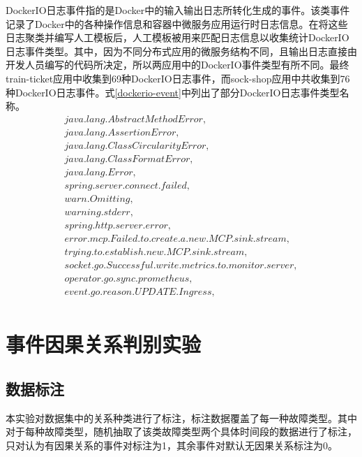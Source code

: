 DockerIO日志事件指的是Docker中的输入输出日志所转化生成的事件。该类事件记录了Docker\cite{boettiger2015introduction}中的各种操作信息和容器中微服务应用运行时日志信息。在将这些日志聚类并编写人工模板后，人工模板被用来匹配日志信息以收集统计DockerIO日志事件类型。其中，因为不同分布式应用的微服务结构不同，且输出日志直接由开发人员编写的代码所决定，所以两应用中的DockerIO事件类型有所不同。最终train-ticket应用中收集到69种DockerIO日志事件，而sock-shop应用中共收集到76种DockerIO日志事件。式\ref{dockerio-event}中列出了部分DockerIO日志事件类型名称。
\begin{equation}
    \begin{array}{l}
        java.lang.AbstractMethodError,\\
        java.lang.AssertionError,\\
        java.lang.ClassCircularityError,\\
        java.lang.ClassFormatError,\\
        java.lang.Error,\\
        spring.server.connect.failed,\\
        warn.Omitting,\\
        warning.stderr,\\
        spring.http.server.error,\\
        error.mcp.Failed.to.create.a.new.MCP.sink.stream,\\
        trying.to.establish.new.MCP.sink.stream,\\
        socket.go.Successful.write.metrics.to.monitor.server,\\
        operator.go.sync.prometheus,\\
        event.go.reason.UPDATE.Ingress,\\
    \end{array}
    \label{dockerio-event}
\end{equation}

\section{事件因果关系判别实验}
\subsection{数据标注}
本实验对数据集中的关系种类进行了标注，标注数据覆盖了每一种故障类型。其中对于每种故障类型，随机抽取了该类故障类型两个具体时间段的数据进行了标注，只对认为有因果关系的事件对标注为1，其余事件对默认无因果关系标注为0。

